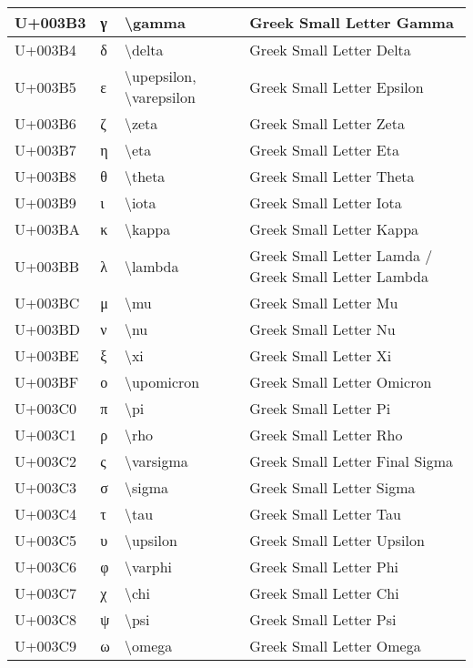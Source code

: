 \begin{table}[h]
\begin{tabulary}{\linewidth}{|L|L|L|L|}
\hline
U+003B3 & γ & {\textbackslash}gamma & Greek Small Letter Gamma \\
\hline
U+003B4 & δ & {\textbackslash}delta & Greek Small Letter Delta \\
\hline
U+003B5 & ε & {\textbackslash}upepsilon, {\textbackslash}varepsilon & Greek Small Letter Epsilon \\
\hline
U+003B6 & ζ & {\textbackslash}zeta & Greek Small Letter Zeta \\
\hline
U+003B7 & η & {\textbackslash}eta & Greek Small Letter Eta \\
\hline
U+003B8 & θ & {\textbackslash}theta & Greek Small Letter Theta \\
\hline
U+003B9 & ι & {\textbackslash}iota & Greek Small Letter Iota \\
\hline
U+003BA & κ & {\textbackslash}kappa & Greek Small Letter Kappa \\
\hline
U+003BB & λ & {\textbackslash}lambda & Greek Small Letter Lamda / Greek Small Letter Lambda \\
\hline
U+003BC & μ & {\textbackslash}mu & Greek Small Letter Mu \\
\hline
U+003BD & ν & {\textbackslash}nu & Greek Small Letter Nu \\
\hline
U+003BE & ξ & {\textbackslash}xi & Greek Small Letter Xi \\
\hline
U+003BF & ο & {\textbackslash}upomicron & Greek Small Letter Omicron \\
\hline
U+003C0 & π & {\textbackslash}pi & Greek Small Letter Pi \\
\hline
U+003C1 & ρ & {\textbackslash}rho & Greek Small Letter Rho \\
\hline
U+003C2 & ς & {\textbackslash}varsigma & Greek Small Letter Final Sigma \\
\hline
U+003C3 & σ & {\textbackslash}sigma & Greek Small Letter Sigma \\
\hline
U+003C4 & τ & {\textbackslash}tau & Greek Small Letter Tau \\
\hline
U+003C5 & υ & {\textbackslash}upsilon & Greek Small Letter Upsilon \\
\hline
U+003C6 & φ & {\textbackslash}varphi & Greek Small Letter Phi \\
\hline
U+003C7 & χ & {\textbackslash}chi & Greek Small Letter Chi \\
\hline
U+003C8 & ψ & {\textbackslash}psi & Greek Small Letter Psi \\
\hline
U+003C9 & ω & {\textbackslash}omega & Greek Small Letter Omega \\

\end{tabulary}
\end{table}
